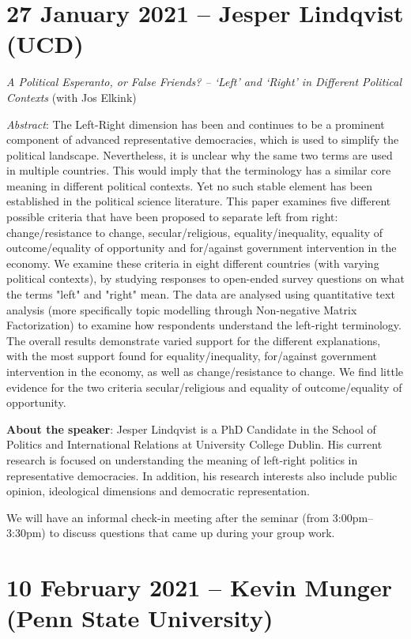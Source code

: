 \documentclass[abstract=on,parskip=full,headings=standardclasses,fontsize=11pt,paper=a4]{scrartcl}
\begin{document}
\section{27 January 2021 -- Jesper Lindqvist (UCD)}

\textit{A Political Esperanto, or False Friends? – `Left' and `Right' in Different Political Contexts} (with Jos Elkink)
 
\textit{Abstract}: The Left-Right dimension has been and continues to be a prominent component of advanced representative democracies, which is used to simplify the political landscape. Nevertheless, it is unclear why the same two terms are used in multiple countries. This would imply that the terminology has a similar core meaning in different political contexts. Yet no such stable element has been established in the political science literature. This paper examines five different possible criteria that have been proposed to separate left from right: change/resistance to change, secular/religious, equality/inequality, equality of outcome/equality of opportunity and for/against government intervention in the economy. We examine these criteria in eight different countries (with varying political contexts), by studying responses to open-ended survey questions on what the terms "left" and "right" mean. The data are analysed using quantitative text analysis (more specifically topic modelling through Non-negative Matrix Factorization) to examine how respondents understand the left-right terminology. The overall results demonstrate varied support for the different explanations, with the most support found for equality/inequality, for/against government intervention in the economy, as well as change/resistance to change. We find little evidence for the two criteria secular/religious and equality of outcome/equality of opportunity.


\textbf{About the speaker}: Jesper Lindqvist is a PhD Candidate in the School of Politics and International Relations at University College Dublin. His current research is focused on understanding the meaning of left-right politics in representative democracies. In addition, his research interests also include public opinion, ideological dimensions and democratic representation.


We will have an informal check-in meeting after the seminar (from 3:00pm--3:30pm) to discuss questions that came up during your group work.

\section{10 February 2021 -- Kevin Munger (Penn State University)}
 
\end{document}

